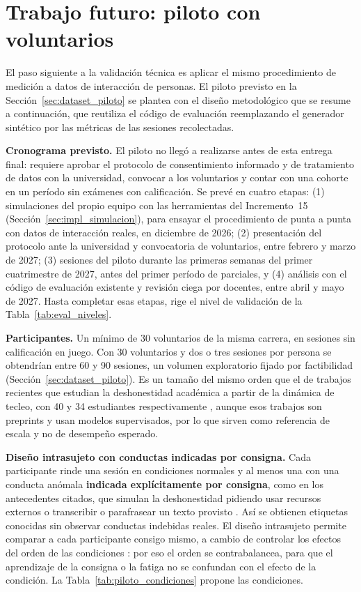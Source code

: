 \section{Trabajo futuro: piloto con voluntarios}
\label{sec:eval_piloto_futuro}

El paso siguiente a la validación técnica es aplicar el mismo procedimiento de medición a datos de interacción de personas. El piloto previsto en la Sección~\ref{sec:dataset_piloto} se plantea con el diseño metodológico que se resume a continuación, que reutiliza el código de evaluación reemplazando el generador sintético por las métricas de las sesiones recolectadas.

\textbf{Cronograma previsto.} El piloto no llegó a realizarse antes de esta entrega final: requiere aprobar el protocolo de consentimiento informado y de tratamiento de datos con la universidad, convocar a los voluntarios y contar con una cohorte en un período sin exámenes con calificación. Se prevé en cuatro etapas: (1) simulaciones del propio equipo con las herramientas del Incremento~15 (Sección~\ref{sec:impl_simulacion}), para ensayar el procedimiento de punta a punta con datos de interacción reales, en diciembre de 2026; (2) presentación del protocolo ante la universidad y convocatoria de voluntarios, entre febrero y marzo de 2027; (3) sesiones del piloto durante las primeras semanas del primer cuatrimestre de 2027, antes del primer período de parciales, y (4) análisis con el código de evaluación existente y revisión ciega por docentes, entre abril y mayo de 2027. Hasta completar esas etapas, rige el nivel de validación de la Tabla~\ref{tab:eval_niveles}.

\textbf{Participantes.} Un mínimo de 30 voluntarios de la misma carrera, en sesiones sin calificación en juego. Con 30 voluntarios y dos o tres sesiones por persona se obtendrían entre 60 y 90 sesiones, un volumen exploratorio fijado por factibilidad (Sección~\ref{sec:dataset_piloto}). Es un tamaño del mismo orden que el de trabajos recientes que estudian la deshonestidad académica a partir de la dinámica de tecleo, con 40 y 34 estudiantes respectivamente \parencite{Kundu2024, Mehta2025}, aunque esos trabajos son preprints y usan modelos supervisados, por lo que sirven como referencia de escala y no de desempeño esperado.

\textbf{Diseño intrasujeto con conductas indicadas por consigna.} Cada participante rinde una sesión en condiciones normales y al menos una con una conducta anómala \textbf{indicada explícitamente por consigna}, como en los antecedentes citados, que simulan la deshonestidad pidiendo usar recursos externos o transcribir o parafrasear un texto provisto \parencite{Kundu2024, Mehta2025}. Así se obtienen etiquetas conocidas sin observar conductas indebidas reales. El diseño intrasujeto permite comparar a cada participante consigo mismo, a cambio de controlar los efectos del orden de las condiciones \parencite{Charness2012}: por eso el orden se contrabalancea, para que el aprendizaje de la consigna o la fatiga no se confundan con el efecto de la condición. La Tabla~\ref{tab:piloto_condiciones} propone las condiciones.

